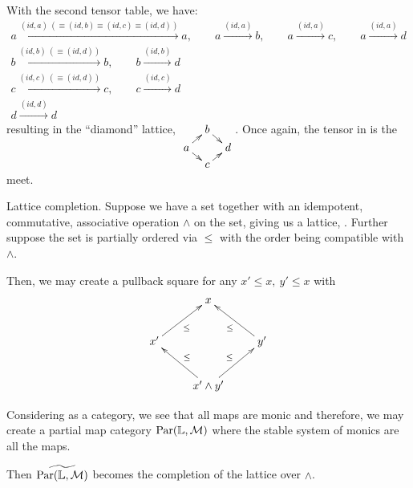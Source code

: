 With the second tensor table, we have:
\begin{align*}
  a \xrightarrow{(id,a) \ (\equiv (id, b) \equiv (id,c) \equiv (id,d))} a, \qquad
    a \xrightarrow{(id,a)} b, \qquad a \xrightarrow{(id, a)} c , \qquad a \xrightarrow{(id, a)} d \\
  b \xrightarrow{(id,b) \ (\equiv (id, d))} b ,  \qquad b \xrightarrow{(id,b)} d\\
  c \xrightarrow{(id, c) \ (\equiv (id, d))} c,   \qquad c \xrightarrow{(id,c)} d\\
  d \xrightarrow{(id,d)} d
\end{align*}
resulting in the ``diamond'' lattice,
$
  \xymatrix @R=3pt @C=8pt {
    & b \ar[dr]\\
    a \ar[ur] \ar[dr] & &d\\
    & c \ar[ur]
  }
$. Once again, the tensor in \D is the meet.

\begin{example}{Lattice completion.}\label{example:lattice_completion}
  Suppose we have a set together with an idempotent, commutative, associative operation $\wedge$ on
  the set, giving us a lattice, \Lat. Further suppose the set is partially ordered via $\le$ with
  the order being compatible with $\wedge$.

  Then, we may create a pullback square for any $x' \le x,\ y' \le x$ with
  \[
    \xymatrix{
      &x\\
      x' \ar[ur]_{\le} & & y' \ar[ul]^{\le}\\
      &x'\wedge y'  \ar[ul]_{\le} \ar[ur]^{\le}
    }
  \]

  Considering \Lat as a category, we see that all maps are monic and therefore, we may create a
  partial map category $\text{Par}(\mathbb{L},\mathcal{M})$ where the stable system of monics are all the maps.

  Then $\widetilde{\text{Par}(\mathbb{L},\mathcal{M})}$ becomes the completion of the lattice over $\wedge$.
\end{example}



